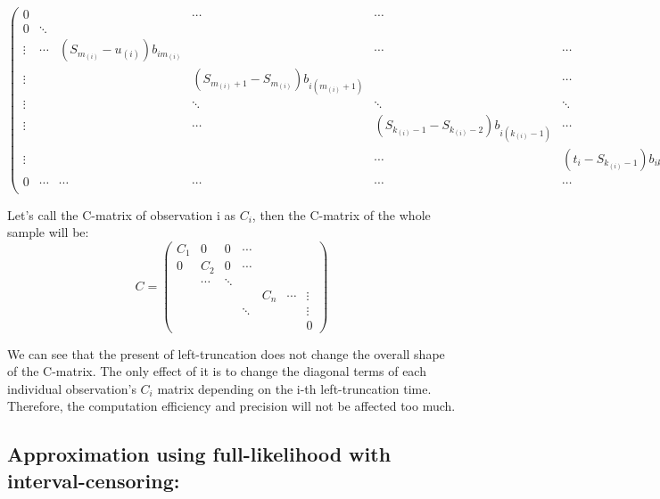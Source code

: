 \documentclass[]{article}
\begin{document}
\begin{equation}
\begin{pmatrix} 
0 &   &  & \cdots & \cdots &  & \cdots \\
0 & \ddots  &   &  & && &  \\
\vdots & \cdots & (S_{m_{(i)}}-u_{(i)}) b_{im_{(i)}} &  & \cdots & \cdots & \cdots &  \\
\vdots & & &(S_{m_{(i)}+1}-S_{m_{(i)}})b_{i(m_{(i)}+1)} &  & \cdots & \cdots& \\
\vdots & & & \ddots  & \ddots & \ddots & \cdots& \\
\vdots  & & & \cdots & (S_{k_{(i)}-1}-S_{k_{(i)}-2})b_{i(k_{(i)}-1)}  & \cdots &  \\
\vdots  & && & \cdots & (t_i-S_{k_{(i)}-1})b_{ik_{(i)}} & \cdots\\
0 & \cdots &  \cdots & \cdots & \cdots & \cdots & \ddots \\
\end{pmatrix}
\end{equation}

Let's call the C-matrix of observation i as \(C_i\), then the C-matrix
of the whole sample will be: \begin{equation}
C = \begin{pmatrix} 
C_1 & 0 & 0 & \cdots & & \\ 
0 & C_2 & 0 & \cdots & & \\
  & \cdots & \ddots &  & & \\
& & & & C_n & \cdots & \vdots \\ 
& & & \ddots & &&\vdots \\
& & & & & & 0
\end{pmatrix}
\end{equation}

We can see that the present of left-truncation does not change the
overall shape of the C-matrix. The only effect of it is to change the
diagonal terms of each individual observation's \(C_i\) matrix depending
on the i-th left-truncation time. Therefore, the computation efficiency
and precision will not be affected too much.

\newpage

\hypertarget{approximation-using-full-likelihood-with-interval-censoring}{%
\subsection{Approximation using full-likelihood with
interval-censoring:}\label{approximation-using-full-likelihood-with-interval-censoring}}
\end{document}
